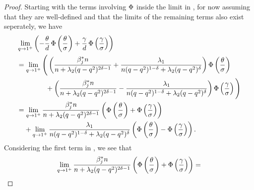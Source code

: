 \begin{proof}
  Starting with the terms involving \(\operatorname{\Phi}\) inside the limit in , for now assuming that they are well-defined and that the limits of the remaining terms also exist seperately, we have
  \begin{align}
     & \lim_{q \rightarrow 1^+} \left(-\frac{\theta}{d} \cdf\left(\frac{\theta}{\sigma}\right) + \frac{\gamma}{d} \cdf \left(\frac{\gamma}{\sigma}\right)\right)                                                                                                                                                                                      \nonumber                                                          \\
     & = \lim_{q \rightarrow 1^+} \Bigg(\left(\frac{\beta_j^* n}{n + \lambda_2 (q-q^2)^{2\delta - 1}} + \frac{\lambda_1}{n(q-q^2)^{1-\delta} + \lambda_2 (q-q^2)^{\delta}} \right) \cdf \left(\frac{\theta}{\sigma}\right)  \nonumber                                                                                                                                                                                    \\
     & \phantom{= \lim_{q \rightarrow 1^+} \Bigg( } + \left(\frac{\beta_j^* n}{n + \lambda_2 (q-q^2)^{2\delta - 1}} - \frac{\lambda_1}{n(q-q^2)^{1-\delta} + \lambda_2 (q-q^2)^{\delta}} \right)\cdf \left(\frac{\gamma}{\sigma}\right) \Bigg) \nonumber                                                                                                                                                                 \\
     & = \lim_{q \rightarrow 1^+} \frac{\beta_j^*n}{n + \lambda_2 (q-q^2)^{2\delta - 1}}\left(\cdf \left(\frac{\theta}{\sigma}\right) + \cdf \left(\frac{\gamma}{\sigma}\right) \right)                                                                                                                                                                                                                        \nonumber \\
     & \phantom{={}} +  \lim_{q \rightarrow 1^+}\frac{\lambda_1}{n(q-q^2)^{1-\delta} + \lambda_2(q -q^2)^{\delta}} \left(\cdf \left(\frac{\theta}{\sigma}\right) - \cdf \left(\frac{\gamma}{\sigma}\right)\right). \label{eq:eval-qlimit-terms}
  \end{align}
  Considering the first term in , we see that
  \[
    \lim_{q \rightarrow 1^+} \frac{\beta_j^*n}{n + \lambda_2 (q-q^2)^{2\delta - 1}}\left(\operatorname{\Phi} \left(\frac{\theta}{\sigma}\right) + \operatorname{\Phi} \left(\frac{\gamma}{\sigma}\right) \right)  =
\]
\end{proof}
